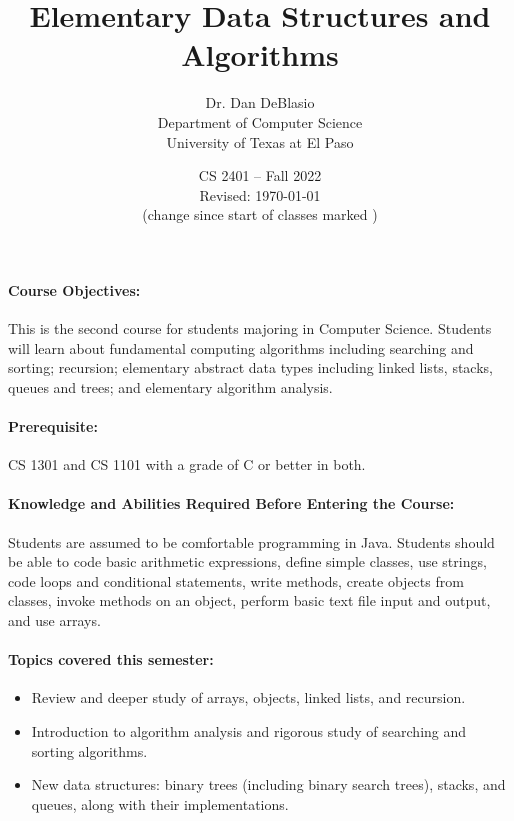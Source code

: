 \documentclass[12pt]{scrartcl}
\title{Elementary Data Structures and Algorithms}\let\Title\@title
\subtitle{
{\small
Dr. Dan DeBlasio\\
Department of Computer Science\\
University of Texas at El Paso\\
}
\vskip-1cm}
\date{\small CS 2401 -- Fall 2022\\ \vspace{1em}Revised: \today\\(change since start of classes marked \change{}{in orange})}
\begin{document}

\maketitle
%
%
\paragraph{Course Objectives:} This is the second course for students majoring in Computer Science. Students will learn about fundamental computing algorithms including searching and sorting; recursion; elementary abstract data types including linked lists, stacks, queues and trees; and elementary algorithm analysis. 

\paragraph{Prerequisite:} CS 1301 and CS 1101 with a grade of C or better in both. 

\paragraph{Knowledge and Abilities Required Before Entering the Course:} Students are assumed to be comfortable programming in Java. Students should be able to code basic arithmetic expressions, define simple classes, use strings, code loops and conditional statements, write methods, create objects from classes, invoke methods on an object, perform basic text file input and output, and use arrays.

\paragraph{Topics covered this semester:}
\begin{itemize} 
\item Review and deeper study of arrays, objects, linked lists, and recursion. 
\item Introduction to algorithm analysis and rigorous study of searching and sorting algorithms. 
\item New data structures: binary trees (including binary search trees), stacks, and queues, along with their implementations. 
\end{itemize}
\end{document}
